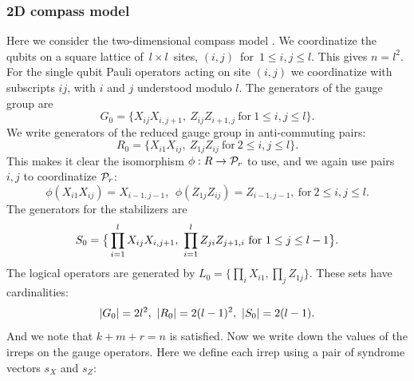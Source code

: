 \documentclass[12pt]{article}
\begin{document}
%
%

\subsubsection{2D compass model}

Here we consider the two-dimensional compass model \cite{Bacon2006}.
We coordinatize the qubits on a square 
lattice of\ $l\times l$\ sites,
$(i, j)$\ for\ $1\le i, j\le l.$
This gives $n = l^2.$
For the single qubit Pauli operators acting on site
$(i, j)$ we coordinatize with subscripts $ij$, 
with $i$ and $j$ understood modulo $l$.
The generators of the gauge group are
$$
    G_0 = \big\{ X_{ij}X_{i,j+1},\ Z_{ij}Z_{i+1,j}\ \mbox{for}\ 1\le i, j\le l\big\}.
$$
We write generators of the reduced
gauge group in anti-commuting pairs:
$$
    R_0 = \big\{ X_{i1}X_{ij},\ Z_{1j}Z_{ij}\ \mbox{for}\ 2\le i, j\le l\big\}.
$$
This makes it clear the isomorphism $\phi : R \to \mathcal{P}_r$ to use,
and we again use pairs $i,j$ to coordinatize $\mathcal{P}_r$:
$$
    \phi(X_{i1}X_{ij}) = X_{i-1,j-1}, \ \ \phi(Z_{1j}Z_{ij}) = Z_{i-1,j-1},\ \mbox{for}\ 2\le i, j\le l.
$$
The generators for the stabilizers are
$$
    \Stab_0 = \big\{ \prod_{i=1}^l X_{ij}X_{i,j+1},\ \prod_{i=1}^l Z_{ji}Z_{j+1,i}\ \mbox{for}\ 1\le j\le l-1\big\}.
$$
The logical operators are generated by $L_0 = \big\{ \prod_i X_{i1}, \prod_j Z_{1j} \}.$
These sets have cardinalities:
$$|G_0|=2l^2,\ |R_0| = 2(l-1)^2,\ |\Stab_0| = 2(l-1).$$
And we note that $k+m+r=n$ is satisfied.
Now we write down the values of the
irreps on the gauge operators.
Here we define each irrep using a pair 
of syndrome vectors $s_X$ and $s_Z:$
\end{document}

